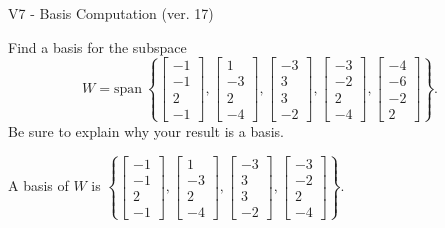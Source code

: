 \begin{exercise}
  \begin{exerciseTitle}V7 - Basis Computation (ver. 17)\end{exerciseTitle}
  \begin{exerciseStatement}
    Find a basis for the subspace 
\[W=\mathrm{span}\ \left\{\left[\begin{array}{r}
-1 \\
-1 \\
2 \\
-1
\end{array}\right] , \left[\begin{array}{r}
1 \\
-3 \\
2 \\
-4
\end{array}\right] , \left[\begin{array}{r}
-3 \\
3 \\
3 \\
-2
\end{array}\right] , \left[\begin{array}{r}
-3 \\
-2 \\
2 \\
-4
\end{array}\right] , \left[\begin{array}{r}
-4 \\
-6 \\
-2 \\
2
\end{array}\right]\right\}.\]
 Be sure to explain why your result is a basis.


  \end{exerciseStatement}
  \begin{exerciseAnswer}
   A basis of \(W\) is  \(\left\{\left[\begin{array}{r}
-1 \\
-1 \\
2 \\
-1
\end{array}\right] , \left[\begin{array}{r}
1 \\
-3 \\
2 \\
-4
\end{array}\right] , \left[\begin{array}{r}
-3 \\
3 \\
3 \\
-2
\end{array}\right] , \left[\begin{array}{r}
-3 \\
-2 \\
2 \\
-4
\end{array}\right]\right\}\).
  


  \end{exerciseAnswer}
\end{exercise}